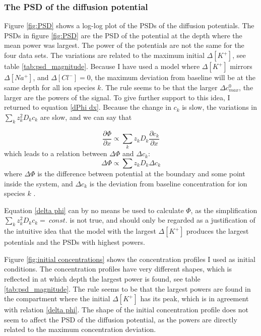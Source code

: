 \documentclass{article}
\begin{document}
\subsubsection{The PSD of the diffusion potential}\label{calculated PSDs}
Figure \ref{fig:PSD} shows a log-log plot of the PSDs of the diffusion potentials. The PSDs in figure \ref{fig:PSD} are the PSD of the potential at the depth where the mean power was largest. The power of the potentials are not the same for the four data sets. The variations are related to the maximum initial $\Delta [K^+]$, see table \ref{tab:psd_magnitude}. Because I have used a model where $\Delta [K^+]$ mirrors $\Delta [Na^+]$, and $\Delta [Cl^-] =0$, the maximum deviation from baseline will be at the same depth for all ion species $k$. The rule seems to be that the larger $\Delta c^0_{max}$, the larger are the powers of the signal. To give further support to this idea, I returned to equation \ref{dPhi dx}. Because the change in $c_k$ is slow, the variations in $\sum_k z_k^2 D_k c_k$ are slow, and we can say that 

\begin{equation}
 \frac{\partial \Phi}{\partial x}  \propto { \sum_k z_k D_k \frac{\partial c_k}{\partial x} }
\end{equation}
which leads to a relation between $\Delta \Phi$ and $\Delta c_k$:
\begin{equation}\label{delta phi}
 \Delta \Phi \propto \sum z_k D_k \Delta c_k
\end{equation}
where $\Delta \Phi $ is the difference between potential at the boundary and some point inside the system, and $\Delta c_k $ is the deviation from baseline concentration for ion species $k$ . 

Equation \ref{delta phi} can by no means be used to calculate $\Phi$, as the simplification $\sum_k z_k^2 D_k c_k =\ const.$ is not true, and should only be regarded as a justification of the intuitive idea that the model with the largest $\Delta [K^+]$ produces the largest potentials and the PSDs with highest powers. 


Figure \ref{fig:initial concentrations} shows the concentration profiles I used as initial conditions. The concentration profiles have very different shapes, which is reflected in at which depth the largest power is found, see table \ref{tab:psd_magnitude}. The rule seems to be that the largest powers are found in the compartment where the initial $\Delta [K^+]$ has its peak, which is in agreement with relation \ref{delta phi}. The shape of the initial concentration profile does not seem to affect the PSD of the diffusion potential, as the powers are directly related to the maximum concentration deviation. 
\end{document}
